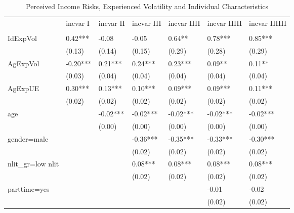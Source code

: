 
\begin{table}[p]
\centering
\begin{adjustbox}{width=\textwidth}
\begin{threeparttable}
\caption{Perceived Income Risks, Experienced Volatility and Individual Characteristics}
\label{micro_reg}\begin{tabular}{lllllll}
\toprule
{} &  incvar I & incvar II & incvar III & incvar IIII & incvar IIIII & incvar IIIIII \\
                    &           &           &            &             &              &               \\
\midrule
IdExpVol            &   0.42*** &     -0.08 &      -0.05 &      0.64** &      0.78*** &       0.85*** \\
                    &    (0.13) &    (0.14) &     (0.15) &      (0.29) &       (0.28) &        (0.29) \\
AgExpVol            &  -0.20*** &   0.21*** &    0.24*** &     0.23*** &       0.09** &        0.11** \\
                    &    (0.03) &    (0.04) &     (0.04) &      (0.04) &       (0.04) &        (0.04) \\
AgExpUE             &   0.30*** &   0.13*** &    0.10*** &     0.09*** &      0.09*** &       0.11*** \\
                    &    (0.02) &    (0.02) &     (0.02) &      (0.02) &       (0.02) &        (0.02) \\
age                 &           &  -0.02*** &   -0.02*** &    -0.02*** &     -0.02*** &      -0.02*** \\
                    &           &    (0.00) &     (0.00) &      (0.00) &       (0.00) &        (0.00) \\
gender=male         &           &           &   -0.36*** &    -0.35*** &     -0.33*** &      -0.30*** \\
                    &           &           &     (0.02) &      (0.02) &       (0.02) &        (0.02) \\
nlit\_gr=low nlit    &           &           &    0.08*** &     0.08*** &      0.08*** &       0.08*** \\
                    &           &           &     (0.02) &      (0.02) &       (0.02) &        (0.02) \\
parttime=yes        &           &           &            &             &        -0.01 &         -0.02 \\
                    &           &           &            &             &       (0.02) &        (0.02) \\

\end{tabular}
\end{threeparttable}
\end{adjustbox}
\end{table}
